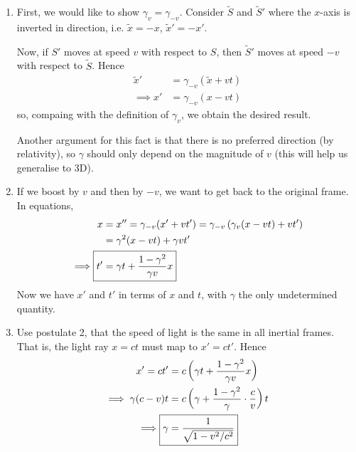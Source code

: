 \documentclass{../../template/note}
\begin{document}
    \begin{enumerate}[label=\protect\circled{\arabic*}]
        \item First, we would like to show \(\gamma_v = \gamma_{-v}\). Consider \(\tilde S\) and \(\tilde S'\) where the \(x\)-axis is inverted in direction, i.e. \(\tilde x = -x\), \(\tilde x' = -x'\).
        
        Now, if \(S'\) moves at speed \(v\) with respect to \(S\), then \(\tilde S'\) moves at speed \(-v\) with respect to \(\tilde S\). Hence
        \begin{align*}
            \tilde x' &= \gamma_{-v} (\tilde x + vt) \\
            \implies x' &= \gamma_{-v} (x - vt)
        \end{align*}
        so, compaing with the definition of \(\gamma_v\), we obtain the desired result.
        
        Another argument for this fact is that there is no preferred direction (by relativity), so \(\gamma\) should only depend on the magnitude of \(v\) (this will help us generalise to 3D).

        \item If we boost by \(v\) and then by \(-v\), we want to get back to the original frame. In equations,
        \begin{align*}
            x &= x'' = \gamma_{-v}(x' + vt') = \gamma_{-v}\left(\gamma_v(x-vt)+vt'\right) \\
            &= \gamma^2(x-vt) + \gamma vt' \\
            \implies \Aboxed{t' &= \gamma t + \frac{1-\gamma^2}{\gamma v}x}
        \end{align*}
        Now we have \(x'\) and \(t'\) in terms of \(x\) and \(t\), with \(\gamma\) the only undetermined quantity.

        \item Use postulate 2, that the speed of light is the same in all inertial frames. That is, the light ray \(x = ct\) must map to \(x'=ct'\). Hence
        \begin{align*}
            x' = ct' &= c\left(\gamma t + \frac{1-\gamma^2}{\gamma v}x\right) \\
            \implies \gamma(c-v)t &= c\left(\gamma + \frac{1-\gamma^2}{\gamma} \cdot \frac c v\right)t \\
            \implies \Aboxed{\gamma &= \frac 1 {\sqrt{1-v^2/c^2}}}
        \end{align*}
    \end{enumerate}
    
\end{document}
